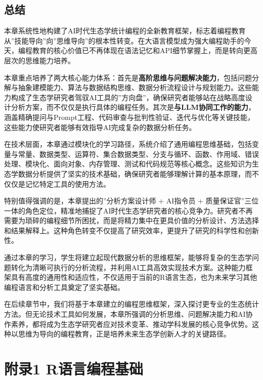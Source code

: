 \documentclass[
]{book}
\begin{document}
\hypertarget{ux603bux7ed3}{%
\section{总结}\label{ux603bux7ed3}}

本章系统性地构建了AI时代生态学统计编程的全新教育框架，标志着编程教育从''技能导向''向''思维导向''的根本性转变。在大语言模型成为强大编程助手的今天，编程教育的核心价值已不再体现在语法记忆和API细节掌握上，而是转向更高层次的思维能力培养。

本章重点培养了两大核心能力体系：首先是\textbf{高阶思维与问题解决能力}，包括问题分解与抽象建模能力、算法与数据结构思维、数据分析流程设计与规划能力。这些能力构成了生态学研究者驾驭AI工具的''方向盘''，确保研究者能够站在战略高度设计分析方案，而不仅仅是执行具体的编程任务。其次是\textbf{与LLM协同工作的能力}，涵盖精确提问与Prompt工程、代码审查与批判性验证、迭代与优化等关键技能，这些能力使研究者能够有效指导AI完成复杂的数据分析任务。

在技术层面，本章通过模块化的学习路径，系统介绍了通用编程思维基础，包括变量与常量、数据类型、运算符、集合数据类型、分支与循环、函数、作用域、错误处理、模块化、面向对象、内存管理、测试和代码规范等核心概念。这些知识为生态学数据分析提供了坚实的技术基础，确保研究者能够理解计算的基本原理，而不仅仅是记忆特定工具的使用方法。

特别值得强调的是，本章提出的''分析方案设计师 + AI指令员 + 质量保证官''三位一体的角色定位，精准地捕捉了AI时代生态学研究者的核心竞争力。研究者不再需要为琐碎的编程细节所困扰，而是将精力集中在更具价值的分析设计、方法选择和结果解释上。这种角色转变不仅提高了研究效率，更提升了研究的科学性和创新性。

通过本章的学习，学生将建立起现代数据分析的思维框架，能够将复杂的生态学问题转化为清晰可执行的分析流程，并利用AI工具高效实现技术方案。这种能力框架具有高度的通用性和适应性，不仅适用于当前的R语言生态，也为未来学习其他编程语言和分析工具奠定了坚实基础。

在后续章节中，我们将基于本章建立的编程思维框架，深入探讨更专业的生态统计方法。但无论技术工具如何发展，本章所强调的分析思维、问题解决能力和AI协作素养，都将成为生态学研究者应对技术变革、推动学科发展的核心竞争优势。这种以思维为导向的编程教育，正是培养未来生态学创新人才的关键路径。

\hypertarget{ux9644ux5f551-rux8bedux8a00ux7f16ux7a0bux57faux7840}{%
\chapter{附录1 R语言编程基础}\label{ux9644ux5f551-rux8bedux8a00ux7f16ux7a0bux57faux7840}}
\end{document}
